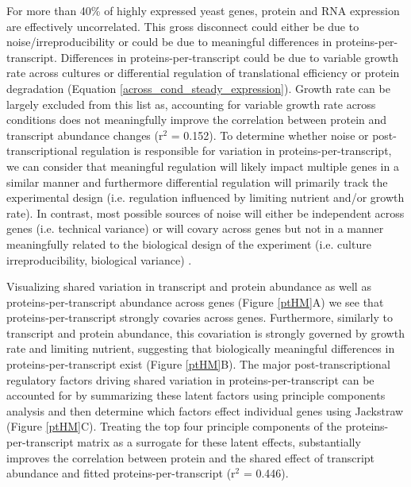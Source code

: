 For more than 40\% of highly expressed yeast genes, protein and RNA expression are effectively uncorrelated.  This gross disconnect could either be due to noise/irreproducibility or could be due to meaningful differences in proteins-per-transcript. Differences in proteins-per-transcript could be due to variable growth rate across cultures or differential regulation of translational efficiency or protein degradation (Equation \ref{across_cond_steady_expression}).  Growth rate can be largely excluded from this list as, accounting for variable growth rate across conditions does not meaningfully improve the correlation between protein and transcript abundance changes (r$^{2}$ = 0.152).  To determine whether noise or post-transcriptional regulation is responsible for variation in proteins-per-transcript, we can consider that meaningful regulation will likely impact multiple genes in a similar manner and furthermore differential regulation will primarily track the experimental design (i.e. regulation influenced by limiting nutrient and/or growth rate).  In contrast, most possible sources of noise will either be independent across genes (i.e. technical variance) or will covary across genes but not in a manner meaningfully related to the biological design of the experiment (i.e. culture irreproducibility, biological variance) \cite{Leek:2007kn}.

Visualizing shared variation in transcript and protein abundance as well as proteins-per-transcript abundance across genes (Figure \ref{ptHM}A) we see that proteins-per-transcript strongly covaries across genes.  Furthermore, similarly to transcript and protein abundance, this covariation is strongly governed by growth rate and limiting nutrient, suggesting that biologically meaningful differences in proteins-per-transcript exist (Figure \ref{ptHM}B). The major post-transcriptional regulatory factors driving shared variation in proteins-per-transcript can be accounted for by summarizing these latent factors using principle components analysis and then determine which factors effect individual genes using Jackstraw \cite{Chung:2015bq} (Figure \ref{ptHM}C). Treating the top four principle components of the proteins-per-transcript matrix as a surrogate for these latent effects, substantially improves the correlation between protein and the shared effect of transcript abundance and fitted proteins-per-transcript (r$^{2}$ = 0.446).

